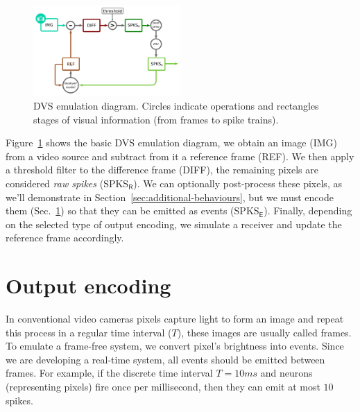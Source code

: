 \documentclass[conference]{IEEEtran}
\begin{document}
%
\begin{figure}[htb]
  \includegraphics[width=0.5\textwidth]{dvs_emu}
  
  \caption{DVS emulation diagram. Circles indicate operations and rectangles stages of visual information (from frames to spike trains).}
  \label{fig:dvs_emu}
\end{figure}

Figure~\ref{fig:dvs_emu} shows the basic DVS emulation diagram, we obtain an image (\textsf{IMG}) from a video source and subtract from it a reference frame (\textsf{REF}). We then apply a threshold filter to the difference frame (\textsf{DIFF}), the remaining pixels are considered \textit{raw spikes} (\textsf{SPKS}$\mathsf{_R}$). We can optionally post-process these pixels, as we'll demonstrate in Section~\ref{sec:additional-behaviours}, but we must encode them (Sec.~\ref{sec:output-modes}) so that they can be emitted as events (\textsf{SPKS}$\mathsf{_E}$). Finally, depending on the selected type of output encoding, we simulate a receiver and update the reference frame accordingly. 


\section{Output encoding}
\label{sec:output-modes}
In conventional video cameras pixels capture light to form an image and repeat this process in a regular time interval ($T$), these images are usually called frames. To emulate a frame-free system, we convert pixel's brightness into events. Since we are developing a real-time system, all events should be emitted between frames. For example, if the discrete time interval $T = 10 ms$ and neurons (representing pixels) fire once per millisecond, then they can emit at most $10$ spikes.
\end{document}
